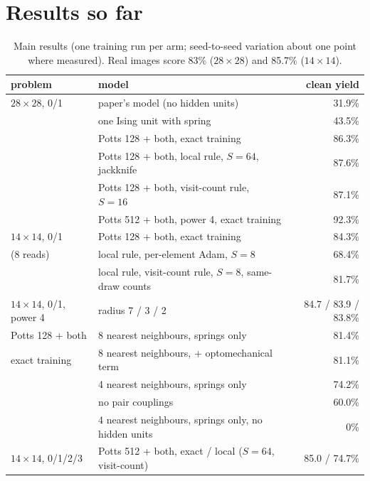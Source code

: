 \documentclass[11pt,a4paper]{article}
\begin{document}
\section{Results so far}\label{sec:results}

\begin{table}[h]\centering\small
\begin{tabular}{llr}
\toprule
problem & model & clean yield \\
\midrule
$28\times28$, 0/1 & paper's model (no hidden units) & 31.9\% \\
                  & one Ising unit with spring & 43.5\% \\
                  & Potts 128 + both, exact training & 86.3\% \\
                  & Potts 128 + both, local rule, $S=64$, jackknife & 87.6\% \\
                  & Potts 128 + both, visit-count rule, $S=16$ & 87.1\% \\
                  & Potts 512 + both, power 4, exact training & 92.3\% \\
\midrule
$14\times14$, 0/1 & Potts 128 + both, exact training & 84.3\% \\
(8 reads)         & local rule, per-element Adam, $S=8$ & 68.4\% \\
                  & local rule, visit-count rule, $S=8$, same-draw counts & 81.7\% \\
\midrule
$14\times14$, 0/1, power 4 & radius 7 / 3 / 2 & 84.7 / 83.9 / 83.8\% \\
Potts 128 + both & 8 nearest neighbours, springs only & 81.4\% \\
exact training   & 8 nearest neighbours, + optomechanical term & 81.1\% \\
                 & 4 nearest neighbours, springs only & 74.2\% \\
                 & no pair couplings & 60.0\% \\
                 & 4 nearest neighbours, springs only, no hidden units & 0\% \\
\midrule
$14\times14$, 0/1/2/3 & Potts 512 + both, exact / local ($S=64$, visit-count) & 85.0 / 74.7\% \\
\bottomrule
\end{tabular}
\caption{Main results (one training run per arm; seed-to-seed variation about one point where measured). Real
images score 83\% ($28\times28$) and 85.7\% ($14\times14$).}
\end{table}
\end{document}
